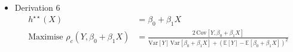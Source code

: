 \documentclass{article}
\begin{document}
\begin{itemize}
    \begin{align*}
        \frac{\text{Cov}(Y,X)}{\sqrt{\text{Var}[Y]\text{Var}[X]}}
        &= \frac{\text{E}[YX] - \text{E}[Y]\text{E}[X]}{\sqrt{\text{Var}[Y]\text{Var}[X]}} \\
        &= \text{/ law of total expectation /} \\
        &= \frac{\text{E}[\text{E}(YX\mid X)] - \text{E}[\text{E}[Y|X]]\text{E}[X]}{\sqrt{\text{Var}[Y]\text{Var}[X]}} \\
        &= \frac{\text{E}[X\,\text{E}[Y|X]] - \text{E}[\text{E}[Y|X]]\text{E}[X]}{\sqrt{\text{Var}[Y]\text{Var}[X]}} \\
        &= \text{/ } \text{E}[Y|X] = \beta_0+\beta_1 X\text{ /} \\
        &= \frac{\text{E}[X(\beta_0+\beta_1 X)] - \text{E}[\beta_0+\beta_1 X]\,\text{E}[X]}{\sqrt{\text{Var}[Y]\text{Var}[X]}} \\
        &= \frac{\text{E}[\beta_0 X + \beta_1 X^2] - (\beta_0+\beta_1 \text{E}[X])\text{E}[X]}{\sqrt{\text{Var}[Y]\text{Var}[X]}} \\
        &= \frac{\beta_0 \text{E}[X] + \beta_1 \text{E}[X^2] - \beta_0 \text{E}[X] - \beta_1 \text{E}[X]^2}{\sqrt{\text{Var}[Y]\text{Var}[X]}} \\
        &= \frac{\beta_1 \text{E}[X^2] - \beta_1 \text{E}[X]^2}{\sqrt{\text{Var}[Y]\text{Var}[X]}} \\
        &= \frac{\beta_1\big(\text{E}[X^2]-\text{E}[X]^2\big)}{\sqrt{\text{Var}[Y]\text{Var}[X]}} \\
        &= \frac{\beta_1\,\text{Var}[X]}{\sqrt{\text{Var}[Y]\text{Var}[X]}} \\
        &= \beta_1\sqrt{\frac{\text{Var}[X]}{\text{Var}[Y]}}
    \end{align*}
    
    \item Derivation 6
    \begin{align*}
        h^{\star\star}(X) &= \beta_0 + \beta_1 X \\[4pt]
        \text{Maximise } \rho_c(Y,\beta_0+\beta_1 X) &= \frac{2\,\text{Cov}[Y,\beta_0+\beta_1 X]}{\text{Var}[Y]\,\text{Var}[\beta_0+\beta_1 X] + \left(\mathbb{\text{E}}[Y]-\mathbb{\text{E}}[\beta_0+\beta_1 X]\right)^2}
    \end{align*}
    

\end{itemize}
\end{document}
